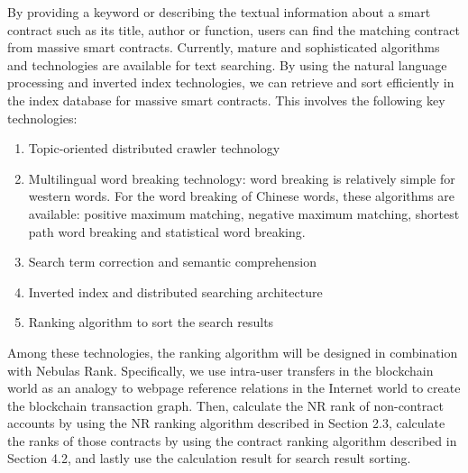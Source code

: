 By providing a keyword or describing the textual information about a smart contract such as its title, author or function, users can find the matching contract from massive smart contracts. Currently, mature and sophisticated algorithms and technologies are available for text searching. By using the natural language processing and inverted index technologies, we can retrieve and sort efficiently in the index database for massive smart contracts. This involves the following key technologies:


\begin{enumerate}
	\item Topic-oriented distributed crawler technology
	\item Multilingual word breaking technology: word breaking is relatively simple for western words. For the word breaking of Chinese words, these algorithms are available: positive maximum matching, negative maximum matching, shortest path word breaking and statistical word breaking.
	\item Search term correction and semantic comprehension
	\item Inverted index and distributed searching architecture
	\item Ranking algorithm to sort the search results

\end{enumerate}

Among these technologies, the ranking algorithm will be designed in combination with Nebulas Rank. Specifically, we use intra-user transfers in the blockchain world as an analogy to webpage reference relations in the Internet world to create the blockchain transaction graph. Then, calculate the NR rank of non-contract accounts by using the NR ranking algorithm described in Section 2.3, calculate the ranks of those contracts by using the contract ranking algorithm described in Section 4.2, and lastly use the calculation result for search result sorting.

